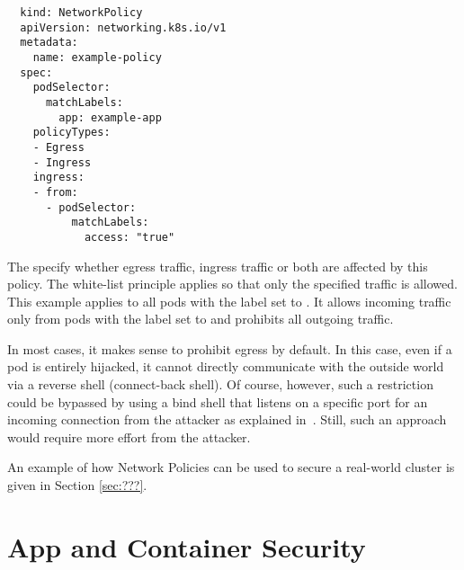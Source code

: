 \begin{verbatim}
  kind: NetworkPolicy
  apiVersion: networking.k8s.io/v1
  metadata:
    name: example-policy
  spec:
    podSelector:
      matchLabels:
        app: example-app
    policyTypes:
    - Egress
    - Ingress
    ingress:
    - from:
      - podSelector:
          matchLabels:
            access: "true"
\end{verbatim}

The  specify whether egress traffic, ingress traffic or both are affected by this policy. The white-list principle applies so that only the specified traffic is allowed. This example applies to all pods with the label  set to . It allows incoming traffic only from pods with the label  set to  and prohibits all outgoing traffic.

In most cases, it makes sense to prohibit egress by default. In this case, even if a pod is entirely hijacked, it cannot directly communicate with the outside world via a reverse shell (connect-back shell). Of course, however, such a restriction could be bypassed by using a bind shell that listens on a specific port for an incoming connection from the attacker as explained in~\textcite{bindAndReverseShells}. Still, such an approach would require more effort from the attacker.

An example of how Network Policies can be used to secure a real-world cluster is given in Section \ref{sec:???}. %

\section{App and Container Security} \label{sec:layer4}


